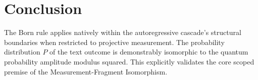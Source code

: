 \documentclass[12pt,a4paper]{article}
\begin{document}
\section{Conclusion}

The Born rule applies natively within the autoregressive cascade's structural boundaries when restricted to projective measurement. The probability distribution $P$ of the text outcome is demonstrably isomorphic to the quantum probability amplitude modulus squared. This explicitly validates the core scoped premise of the Measurement-Fragment Isomorphism.
\end{document}
